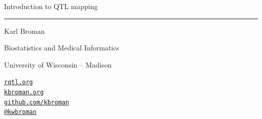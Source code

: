 \documentclass[12pt]{article}
\newcommand{\titlesize}{\fontsize{40}{50} \selectfont}
\newcommand{\textsize}{\fontsize{30}{35} \selectfont}
\newcommand{\smallsize}{\fontsize{25}{30} \selectfont}
\begin{document}
\thispagestyle{empty}

\begin{center}
\titlesize \color{myyellow}


\vspace*{15mm}

Introduction to QTL mapping

\color{mypink}
\rule{10in}{1mm}

\vspace{5mm}

\textsize \color{myblue}
Karl Broman
\vspace{5mm}

\color{mywhite}
{\smallsize Biostatistics and Medical Informatics

University of Wisconsin -- Madison
\vspace{20mm}


\href{http://rqtl.org}{\tt rqtl.org} \\[3pt]
\href{https://kbroman.org}{\tt kbroman.org} \\[3pt]
\href{https://github.com/kbroman}{\tt github.com/kbroman} \\
\href{https://twitter.com/kwbroman}{\tt @kwbroman}
}

\end{center}

\newpage

\thispagestyle{empty}

\vspace*{-0.85in}
\end{document}
